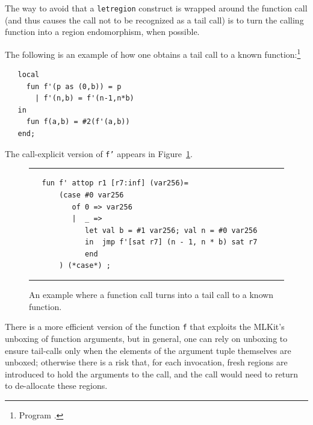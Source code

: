 \documentclass[12pt]{book}
\begin{document}
The way to avoid that a {\tt letregion} construct is wrapped around
the function call (and thus causes the call not to be recognized as a
tail call) is to turn the calling function into a region endomorphism,
when possible.

The following is an example of how one obtains a tail call to a known
function:\footnote{Program .}
\begin{verbatim}
   local
     fun f'(p as (0,b)) = p
       | f'(n,b) = f'(n-1,n*b)
   in
     fun f(a,b) = #2(f'(a,b))
   end;
\end{verbatim}
The call-explicit version of {\tt f'} appears in
Figure~\ref{tail.fig}.
\begin{figure}
\hrule \medskip
\begin{verbatim}
   fun f' attop r1 [r7:inf] (var256)= 
       (case #0 var256 
          of 0 => var256
          |  _ => 
             let val b = #1 var256; val n = #0 var256
             in  jmp f'[sat r7] (n - 1, n * b) sat r7
             end 
       ) (*case*) ; 
\end{verbatim}
\caption{An example where a function call turns into a tail call to a known function.}  
\medskip \hrule
\label{tail.fig}
\end{figure}

There is a more efficient version of the function {\tt f} that
exploits the MLKit's unboxing of function arguments, but in general, one
can rely on unboxing to ensure tail-calls only when the elements of
the argument tuple themselves are unboxed; otherwise there is a risk
that, for each invocation, fresh regions are introduced to hold the
arguments to the call, and the call would need to return to
de-allocate these regions.
\end{document}
